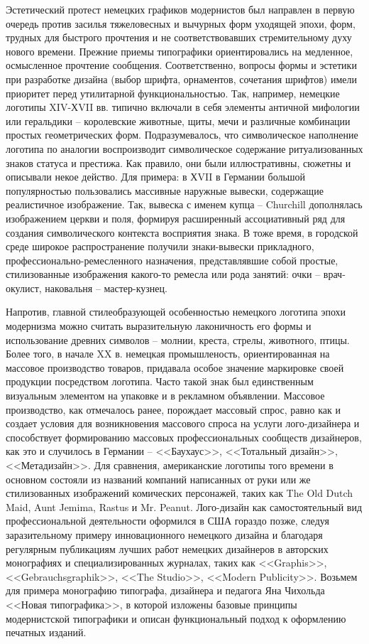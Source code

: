 Эстетический протест немецких графиков модернистов был направлен в первую очередь против засилья
тяжеловесных и вычурных форм уходящей эпохи, форм, трудных для быстрого прочтения и не
соответствовавших стремительному духу нового времени. Прежние приемы типографики ориентировались на
медленное, осмысленное прочтение сообщения. Соответственно, вопросы формы и эстетики при разработке
дизайна (выбор шрифта, орнаментов, сочетания шрифтов) имели приоритет перед утилитарной
функциональностью. Так, например, немецкие логотипы XIV-ХVII вв. типично включали в себя элементы
античной мифологии или геральдики -- королевские животные, щиты, мечи и различные комбинации простых
геометрических форм. Подразумевалось, что символическое наполнение логотипа по аналогии
воспроизводит символическое содержание ритуализованных знаков статуса и престижа. Как правило, они
были иллюстративны, сюжетны и описывали некое действо. Для примера: в ХVII в Германии большой
популярностью пользовались массивные наружные вывески, содержащие реалистичное изображение. Так,
вывеска с именем купца -- Churchill дополнялась изображением церкви и поля, формируя расширенный
ассоциативный ряд для создания символического контекста восприятия знака. В тоже время, в городской
среде широкое распространение получили знаки-вывески прикладного, профессионально-ремесленного
назначения, представлявшие собой простые, стилизованные изображения какого-то ремесла или рода
занятий: очки -- врач-окулист, наковальня -- мастер-кузнец.

Напротив, главной стилеобразующей особенностью немецкого логотипа эпохи модернизма можно считать
выразительную лаконичность его формы и использование древних символов – молнии, креста, стрелы,
животного, птицы. Более того, в начале XX в. немецкая промышленость, ориентированная на массовое
производство товаров, придавала особое значение маркировке своей продукции посредством
логотипа. Часто такой знак был единственным визуальным элементом на упаковке и в рекламном
объявлении. Массовое производство, как отмечалось ранее, порождает массовый спрос, равно как и
создает условия для возникновения массового спроса на услуги лого-дизайнера и способствует
формированию массовых профессиональных сообществ дизайнеров, как это и случилось в Германии --
<<Баухаус>>, <<Тотальный дизайн>>, <<Метадизайн>>. Для сравнения, американские логотипы того времени в
основном состояли из названий компаний написанных от руки или же стилизованных изображений
комических персонажей, таких как The Old Dutch Maid, Aunt Jemima, Rastus и
Mr. Peanut. \autocite{link:mpr} Лого-дизайн как самостоятельный вид профессиональной деятельности
оформился в США гораздо позже, следуя заразительному примеру инновационного немецкого дизайна и
благодаря регулярным публикациям лучших работ немецких дизайнеров в авторских монографиях и
специализированных журналах, таких как <<Graphis>>, <<Gebrauchsgraphik>>, <<The Studio>>, <<Modern
Publicity>>. Возьмем для примера монографию типографа, дизайнера и педагога Яна Чихольда <<Новая
типографика>>\autocite{chihold2011}, в которой изложены базовые принципы модернистской типографики и
описан функциональный подход к оформлению печатных изданий.

